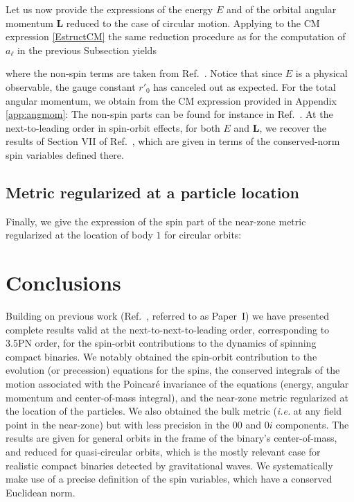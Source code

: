 \documentclass[
superscriptaddress,
preprint,
prd,tightenlines,showpacs,nofootinbib,
eqsecnum,
amsfonts,amsmath,amssymb]{revtex4-1}
\begin{document}
Let us now provide the expressions of the energy $E$ and of the
orbital angular momentum $\mathbf{L}$ reduced to the case of circular
motion. Applying to the CM expression \eqref{EstructCM} the same
reduction procedure as for the computation of $a_\ell$ in the previous
Subsection yields
%

%
where the non-spin terms are taken from
Ref.~\cite{Blanchet2006a}. Notice that since $E$ is a physical
observable, the gauge constant $r'_0$ has canceled out as
expected. For the total angular momentum, we obtain from the CM
expression provided in Appendix \ref{app:angmom}:
%
\noindent
%
The non-spin parts can be found for instance in Ref.~\cite{LeTiec2012}. At the
next-to-leading order in spin-orbit effects, for both $E$ and $\mathbf{L}$, we
recover the results of Section VII of Ref.~\cite{Blanchet2006}, which are
given in terms of the conserved-norm spin variables defined there.

\subsection{Metric regularized at a particle location}

Finally, we give the expression of the spin part of the near-zone metric
regularized at the location of body $1$ for circular orbits:
\begin{subequations}
%

%

%

%
\end{subequations}

\section{Conclusions}
\label{sec:conclusion}

Building on previous work (Ref.~\cite{Marsat2012}, referred to as
Paper~I) we have presented complete results valid at the
next-to-next-to-leading order, corresponding to 3.5PN order, for the
spin-orbit contributions to the dynamics of spinning compact
binaries. We notably obtained the spin-orbit contribution to the
evolution (or precession) equations for the spins, the conserved
integrals of the motion associated with the Poincar\'e invariance of
the equations (energy, angular momentum and center-of-mass integral),
and the near-zone metric regularized at the location of the
particles. We also obtained the bulk metric
  (\textit{i.e.} at any field point in the near-zone) but with less
  precision in the $00$ and $0i$ components. The
results are given for general orbits in the frame of the binary's
center-of-mass, and reduced for quasi-circular orbits, which is the
mostly relevant case for realistic compact binaries detected by
  gravitational waves. We systematically make use of a precise
definition of the spin variables, which have a conserved Euclidean
norm.
\end{document}
